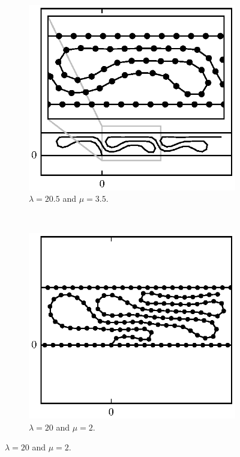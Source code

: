 	\begin{figure}
		\centering
		\begin{subfigure}{.5\textwidth}
			\centering
			\includegraphics{./fig/ch3/push/eb0.1/l20.5_m3.5.eps}
			\caption{$\lambda=20.5$ and $\mu=3.5$.\label{subfig:multi_bridge}}
		\end{subfigure}%
		~
		\begin{subfigure}{.5\textwidth}
			\centering
			\includegraphics{./fig/ch3/push/eb0.1_et0.1/l20_m2.eps}
			\caption{$\lambda=20$ and $\mu=2$.\label{subfig:slant_crushed}}
		\end{subfigure}


\end{figure}
